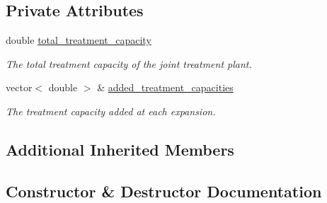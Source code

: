 \subsection*{Private Attributes}
\begin{DoxyCompactItemize}
\item 
double \mbox{\hyperlink{classSequentialJointTreatmentExpansion_a35db39c86948882acbc30fe970f55d52}{total\+\_\+treatment\+\_\+capacity}}
\begin{DoxyCompactList}\small\item\em The total treatment capacity of the joint treatment plant. \end{DoxyCompactList}\item 
vector$<$ double $>$ \& \mbox{\hyperlink{classSequentialJointTreatmentExpansion_a4c65188f0460e825e3595b9274141910}{added\+\_\+treatment\+\_\+capacities}}
\begin{DoxyCompactList}\small\item\em The treatment capacity added at each expansion. \end{DoxyCompactList}\end{DoxyCompactItemize}
\subsection*{Additional Inherited Members}


\subsection{Constructor \& Destructor Documentation}
\mbox{\label{classSequentialJointTreatmentExpansion_ad3ca28eaaa041be6ebbd0a4593d5c9ab}} 
